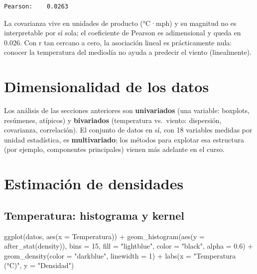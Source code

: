 \documentclass[oneside, openany, fontset=libertinus]{mitthesis}
\newenvironment{Shaded}{\begin{snugshade}}{\end{snugshade}}
\newcommand{\AttributeTok}[1]{\textcolor[rgb]{0.40,0.45,0.13}{#1}}
\newcommand{\DecValTok}[1]{\textcolor[rgb]{0.68,0.00,0.00}{#1}}
\newcommand{\FloatTok}[1]{\textcolor[rgb]{0.68,0.00,0.00}{#1}}
\newcommand{\FunctionTok}[1]{\textcolor[rgb]{0.28,0.35,0.67}{#1}}
\newcommand{\NormalTok}[1]{\textcolor[rgb]{0.00,0.23,0.31}{#1}}
\newcommand{\SpecialCharTok}[1]{\textcolor[rgb]{0.37,0.37,0.37}{#1}}
\newcommand{\StringTok}[1]{\textcolor[rgb]{0.13,0.47,0.30}{#1}}
\begin{document}
\begin{verbatim}
Pearson:    0.0263 
\end{verbatim}

La covarianza vive en unidades de producto (°C·mph) y su magnitud no es
interpretable por sí sola; el coeficiente de Pearson es adimensional y
queda en 0.026. Con \textbar r\textbar{} tan cercano a cero, la
asociación lineal es prácticamente nula: conocer la temperatura del
mediodía no ayuda a predecir el viento (linealmente).

\chapter{Dimensionalidad de los datos}\label{p9}

Los análisis de las secciones anteriores son \textbf{univariados} (una
variable: boxplots, resúmenes, atípicos) y \textbf{bivariados}
(temperatura vs.~viento: dispersión, covarianza, correlación). El
conjunto de datos en sí, con 18 variables medidas por unidad
estadística, es \textbf{multivariado}; los métodos para explotar esa
estructura (por ejemplo, componentes principales) vienen más adelante en
el curso.

\chapter{Estimación de densidades}\label{p10}

\section{Temperatura: histograma y
kernel}\label{temperatura-histograma-y-kernel}

\begin{Shaded}
\begin{Highlighting}[]
\FunctionTok{ggplot}\NormalTok{(datos, }\FunctionTok{aes}\NormalTok{(}\AttributeTok{x =}\NormalTok{ Temperatura)) }\SpecialCharTok{+}
  \FunctionTok{geom\_histogram}\NormalTok{(}\FunctionTok{aes}\NormalTok{(}\AttributeTok{y =} \FunctionTok{after\_stat}\NormalTok{(density)), }\AttributeTok{bins =} \DecValTok{15}\NormalTok{,}
                 \AttributeTok{fill =} \StringTok{"lightblue"}\NormalTok{, }\AttributeTok{color =} \StringTok{"black"}\NormalTok{, }\AttributeTok{alpha =} \FloatTok{0.6}\NormalTok{) }\SpecialCharTok{+}
  \FunctionTok{geom\_density}\NormalTok{(}\AttributeTok{color =} \StringTok{"darkblue"}\NormalTok{, }\AttributeTok{linewidth =} \DecValTok{1}\NormalTok{) }\SpecialCharTok{+}
  \FunctionTok{labs}\NormalTok{(}\AttributeTok{x =} \StringTok{"Temperatura (°C)"}\NormalTok{, }\AttributeTok{y =} \StringTok{"Densidad"}\NormalTok{)}
\end{Highlighting}
\end{Shaded}
\end{document}
